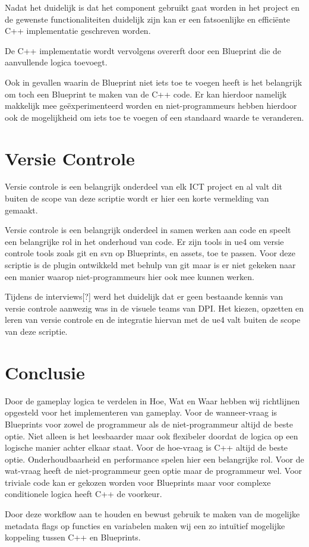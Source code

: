 Nadat het duidelijk is dat het component gebruikt gaat worden in het project en de gewenste functionaliteiten duidelijk zijn kan er een fatsoenlijke en efficiënte C++ implementatie geschreven worden.

De C++ implementatie wordt vervolgens overerft door een Blueprint die de aanvullende logica toevoegt.

Ook in gevallen waarin de Blueprint niet iets toe te voegen heeft is het belangrijk om toch een Blueprint te maken van de C++ code. Er kan hierdoor namelijk makkelijk mee geëxperimenteerd worden en niet-programmeurs hebben hierdoor ook de mogelijkheid om iets toe te voegen of een standaard waarde te veranderen.

\section{Versie Controle}
Versie controle is een belangrijk onderdeel van elk ICT project en al valt dit buiten de scope van deze scriptie wordt er hier een korte vermelding van gemaakt.

Versie controle is een belangrijk onderdeel in samen werken aan code en speelt een belangrijke rol in het onderhoud van code. Er zijn tools in \gls{ue4} om versie controle tools zoals git en svn op Blueprints, en assets, toe te passen. Voor deze scriptie is de plugin ontwikkeld met behulp van git maar is er niet gekeken naar een manier waarop niet-programmeurs hier ook mee kunnen werken.

Tijdens de interviews[?] werd het duidelijk dat er geen bestaande kennis van versie controle aanwezig was in de visuele teams van DPI. Het kiezen, opzetten en leren van versie controle en de integratie hiervan met de \gls{ue4} valt buiten de scope van deze scriptie.

\section{Conclusie}
Door de gameplay logica te verdelen in Hoe, Wat en Waar hebben wij richtlijnen opgesteld voor het implementeren van gameplay. Voor de wanneer-vraag is Blueprints voor zowel de programmeur als de niet-programmeur altijd de beste optie. Niet alleen is het leesbaarder maar ook flexibeler doordat de logica op een logische manier achter elkaar staat. Voor de hoe-vraag is C++ altijd de beste optie. Onderhoudbaarheid en performance spelen hier een belangrijke rol. Voor de wat-vraag heeft de niet-programmeur geen optie maar de programmeur wel. Voor triviale code kan er gekozen worden voor Blueprints maar voor complexe conditionele logica heeft C++ de voorkeur. 

Door deze workflow aan te houden en bewust gebruik te maken van de mogelijke metadata flags op functies en variabelen maken wij een zo intuïtief mogelijke koppeling tussen C++ en Blueprints.